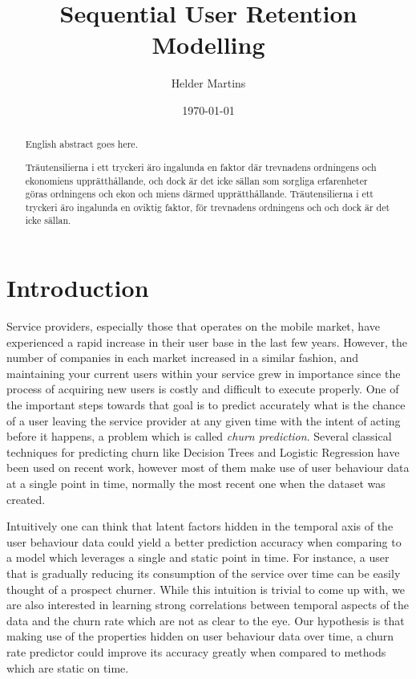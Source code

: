 \documentclass{kththesis}
\title{Sequential User Retention Modelling}
\author{Helder Martins}
\date{\today}
\begin{document}
\flyleaf

\begin{abstract}
  English abstract goes here.
  \lipsum[1-2]
\end{abstract}

\clearpage

\begin{otherlanguage}{swedish}
  \begin{abstract}
    Träutensilierna i ett tryckeri äro ingalunda en faktor där
    trevnadens ordningens och ekonomiens upprätthållande, och dock är
    det icke sällan som sorgliga erfarenheter göras ordningens och
    ekon och miens därmed upprätthållande. Träutensilierna i ett
    tryckeri äro ingalunda en oviktig faktor, för trevnadens
    ordningens och och dock är det icke sällan.
  \end{abstract}
\end{otherlanguage}

\cleardoublepage

\tableofcontents


\mainmatter


\chapter{Introduction}

    Service providers, especially those that operates on the mobile market, have experienced a rapid increase in their user base in the last few years. However, the number of companies in each market increased in a similar fashion, and maintaining your current users within your service grew in importance since the process of acquiring new users is costly and difficult to execute properly. One of the important steps towards that goal is to predict accurately what is the chance of a user leaving the service provider at any given time with the intent of acting before it happens, a problem which is called \emph{churn prediction}. Several classical techniques for predicting churn like Decision Trees and Logistic Regression have been used on recent work, however most of them make use of user behaviour data at a single point in time, normally the most recent one when the dataset was created. 
    
    Intuitively one can think that latent factors hidden in the temporal axis of the user behaviour data could yield a better prediction accuracy when comparing to a model which leverages a single and static point in time. For instance, a user that is gradually reducing its consumption of the service over time can be easily thought of a prospect churner. While this intuition is trivial to come up with, we are also interested in learning strong correlations between temporal aspects of the data and the churn rate which are not as clear to the eye. Our hypothesis is that making use of the properties hidden on user behaviour data over time, a churn rate predictor could improve its accuracy greatly when compared to methods which are static on time.
       
\end{document}
